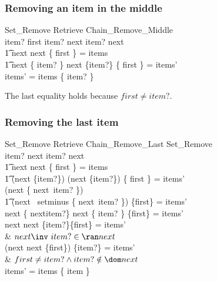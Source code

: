 \documentclass{article}
\begin{document}
\subsubsection{Removing an item in the middle}

\begin{argue}
	\pre Set\_Remove \land \Delta Retrieve \land Chain\_Remove\_Middle \\ 
\implies item? \neq first \land item? \in \dom next \land item? \in \ran next \land {} \\
\t1  \dom next \cup \ran next \cup \{ first \} = items \land {} \\
\t1	\dom next \setminus \{ item? \} \cup \ran next \setminus \{item?\} \cup \{ first \} = items' \\
\implies items' = items \setminus \{ item? \} 
\end{argue}

The last equality holds because $first \neq item?$. 

\subsubsection{Removing the last item}

\begin{argue}
	\pre Set\_Remove \land \Delta Retrieve \land Chain\_Remove\_Last \implies Set\_Remove \\
\implies item? \in \dom next \land item? \notin \ran next \land {} \\
\t1 	\dom next \cup \ran next \cup \{ first \} = items \land {} \\
\t1 	\dom (next \nrres \{item?\}) \cup \ran (next \nrres \{item?\}) \cup \{ first \} = items' \\
\implies \dom (next \setminus \{ next\inv~item? \}) \cup {} \\
\t1 \ran (next \ setminus \{ next\inv~item? \}) \cup \{first\} = items' \\
\implies \dom next \setminus \{ next\inv item?\} \cup \ran next \setminus \{ item? \} \cup \{first\} = items' \\
\implies \dom next \cup \ran next \setminus \{item?\}\cup \{first\} = items' \\
 & $next\inv~item? \in \ran next$ \\
\implies (\dom next \cup \ran next \cup \{first\}) \setminus \{item?\}  = items' \\
& $first \neq item? \land item? \notin \dom next$ \\
\implies items' = items \setminus \{ item \}

\end{argue}
\end{document}
